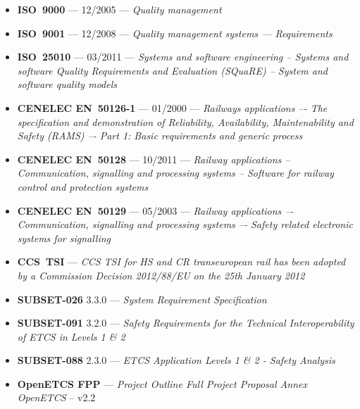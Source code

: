 \begin{itemize}
	\item \textbf{ISO~9000} --- 12/2005 --- \emph{Quality management}
	\item \textbf{ISO~9001} --- 12/2008 --- \emph{Quality management systems — Requirements}
	\item \textbf{ISO~25010} --- 03/2011 --- \emph{Systems and software engineering -- Systems and software Quality Requirements and Evaluation (SQuaRE) -- System and software quality models}
	\item \textbf{CENELEC EN~50126-1} --- 01/2000 --- \emph{Railways applications –- The specification and 
		demonstration of Reliability, Availability, Maintenability and Safety (RAMS) –- Part 1: 
		Basic requirements and generic process}
	\item \textbf{CENELEC EN~50128} --- 10/2011 --- \emph{Railway applications -- Communication, signalling and 
		processing systems -- Software for railway control and protection systems}
	\item \textbf{CENELEC EN~50129} --- 05/2003 --- \emph{Railway applications –- Communication, signalling and 
		processing systems –- Safety related electronic systems for signalling}
\item \textbf{CCS~TSI} --- \emph{ CCS TSI for HS and CR transeuropean rail has been adopted by a Commission Decision 2012/88/EU on the 25th January 2012}
\item \textbf{SUBSET-026} 3.3.0 --- \emph{System Requirement Specification}
\item \textbf{SUBSET-091} 3.2.0 --- \emph{Safety Requirements for the Technical Interoperability
	of ETCS in Levels 1 \& 2}
\item \textbf{SUBSET-088} 2.3.0 --- \emph{ETCS Application Levels 1 \& 2 - Safety Analysis}
\item \textbf{OpenETCS FPP} --- \emph{Project Outline Full Project Proposal Annex OpenETCS} -- v2.2
\end{itemize}


